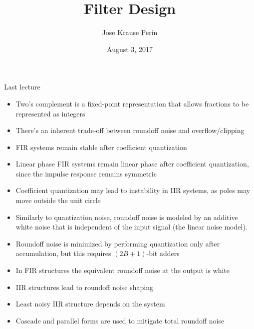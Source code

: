 \documentclass[10pt, handout]{beamer}
\title[EE 264]{Filter Design}
\author{Jose Krause Perin}
\institute{Stanford University}
\date{August 3, 2017}
\begin{document}
\begin{frame}
  \titlepage
\end{frame}

%

%
\begin{frame}{Last lecture}
\begin{itemize}
	\item Two's complement is a fixed-point representation that allows fractions to be represented as integers
	\item There's an inherent trade-off between roundoff noise and overflow/clipping
	\item FIR systems remain stable after coefficient quantization
	\item Linear phase FIR systems remain linear phase after coefficient quantization, since the impulse response remains symmetric
	\item Coefficient quantization may lead to instability in IIR systems, as poles may move outside the unit circle
	\item Similarly to quantization noise, roundoff noise is modeled by an additive white noise that is independent of the input signal (the linear noise model).
	\item Roundoff noise is minimized by performing quantization only after accumulation, but this requires $(2B+1)$-bit adders
	\item In FIR structures the equivalent roundoff noise at the output is white
	\item IIR structures lead to roundoff noise shaping
	\item Least noisy IIR structure depends on the system
	\item Cascade and parallel forms are used to mitigate total roundoff noise
\end{itemize}
\end{frame}
\end{document}
